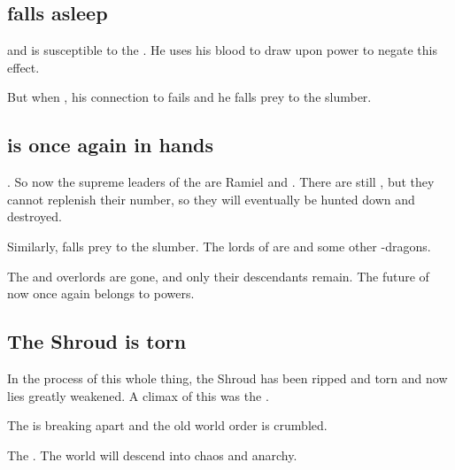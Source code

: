\subsection{\Vizsherioch falls asleep}
\Vizsherioch{}  and is susceptible to the . He uses his \bane{} blood to draw upon \Erebean{} power to negate this effect. 

But when , his connection to \Erebos{} fails and he falls prey to the \xsic{} slumber. 







\subsection{\Miith is once again in \Miithian hands}
. So now the supreme leaders of the \resphain{} are Ramiel and . There are still \banelords, but they cannot replenish their number, so they will eventually be hunted down and destroyed. 

Similarly, \Vizsherioch{} falls prey to the \xzaishannic{} slumber. The lords of \dragonkind{} are \Ishnaruchaefir{} and some other \uber-dragons. 

The \Erebean{} and \Machaic{} overlords are gone, and only their descendants remain. The future of \Miith{} now once again belongs to \Miithian{} powers. 









\subsection{The Shroud is torn}
In the process of this whole thing, the Shroud has been ripped and torn and now lies greatly weakened. A climax of this was the . 

The \charade{} is breaking apart and the old world order is crumbled. 

The . 
The world will descend into chaos and anarchy. 


